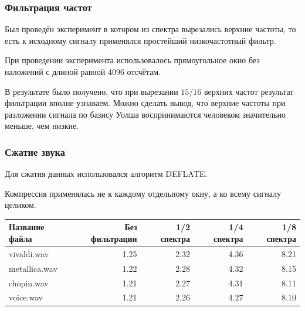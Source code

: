 \documentclass[notes=only]{beamer}
\begin{document}
  
\begin{frame}\frametitle{Фильтрация частот}
Был проведён эксперимент в котором из спектра вырезались верхние частоты, то есть
к исходному сигналу применялся простейший низкочастотный фильтр.

При проведении эксперимента использовалось прямоугольное окно без наложений с длиной
равной 4096 отсчётам.

В результате было получено,
что при вырезании $15/16$ верхних частот результат фильтрации вполне узнаваем.
Можно сделать вывод, что верхние частоты при разложении сигнала по
базису Уолша воспринимаются человеком значительно меньше, чем низкие.

\end{frame}
    
  
\begin{frame}\frametitle{Сжатие звука}
Для сжатия данных использовался алгоритм DEFLATE.

Компрессия применялась не к каждому отдельному окну, а ко всему
сигналу целиком.

\begin{table}
  \centering
    \resizebox{\textwidth}{!} {
    \begin{tabular}{ | p{2.6cm} | r | r | r | r |}
    \hline
    Название файла & Без фильтрации & 1/2 спектра & 1/4 спектра & 1/8 спектра \\ \hline
    vivaldi.wav     & 1.25  & 2.32  & 4.36  & 8.21 \\ \hline
    metallica.wav   & 1.22  & 2.28  & 4.32  & 8.15 \\ \hline
    chopin.wav      & 1.21  & 2.27  & 4.31  & 8.11 \\ \hline
    voice.wav       & 1.21  & 2.26  & 4.27  & 8.10 \\ \hline
    \end{tabular}}
\end{table}

\end{frame}
    
\end{document}
